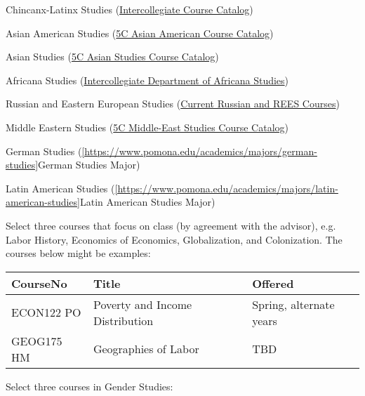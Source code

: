 \documentclass{article}\usepackage[]{graphicx}\usepackage[]{xcolor}
\newenvironment{itemize*}%
  {\begin{itemize}%
    \setlength{\itemsep}{0pt}%
    \setlength{\parskip}{0pt}}%
  {\end{itemize}}
\begin{document}
\begin{description}
\begin{itemize*}
  \item Chincanx-Latinx Studies (\href{https://catalog.pomona.edu/preview_entity.php?catoid=47&ent_oid=2387}{Intercollegiate Course Catalog})
  \item Asian American Studies (\href{https://catalog.pomona.edu/preview_entity.php?catoid=47&ent_oid=2381}{5C Asian American Course Catalog})
  \item Asian Studies (\href{https://catalog.pomona.edu/preview_entity.php?catoid=47&ent_oid=2383}{5C Asian Studies Course Catalog})
  \item Africana Studies (\href{https://colleges.claremont.edu/africana-studies/}{Intercollegiate Department of Africana Studies})
  \item Russian and Eastern European Studies (\href{https://www.pomona.edu/academics/departments/russian/courses-requirements/rees}{Current Russian and REES Courses})
  \item Middle Eastern Studies (\href{https://catalog.pomona.edu/preview_entity.php?catoid=47&ent_oid=2383}{5C Middle-East Studies Course Catalog})
  \item German Studies (\ref{https://www.pomona.edu/academics/majors/german-studies}{German Studies Major})
  \item Latin American Studies (\ref{https://www.pomona.edu/academics/majors/latin-american-studies}{Latin American Studies Major})
\end{itemize*}

  
  \item[Class] Select three courses that focus on class (by agreement with the advisor), e.g. Labor History, Economics of Economics, Globalization, and Colonization. The courses below might be examples: 
  
\begin{table}[ht]
\centering
\begin{tabular}{lll}
  \hline
CourseNo & Title & Offered \\ 
  \hline
ECON122 PO & Poverty and Income Distribution & Spring, alternate years \\ 
  GEOG175 HM & Geographies of Labor & TBD \\ 
   \hline
\end{tabular}
\end{table}

  
  
  \item[Gender] Select three courses in Gender Studies:
  

\end{description}
\end{document}
